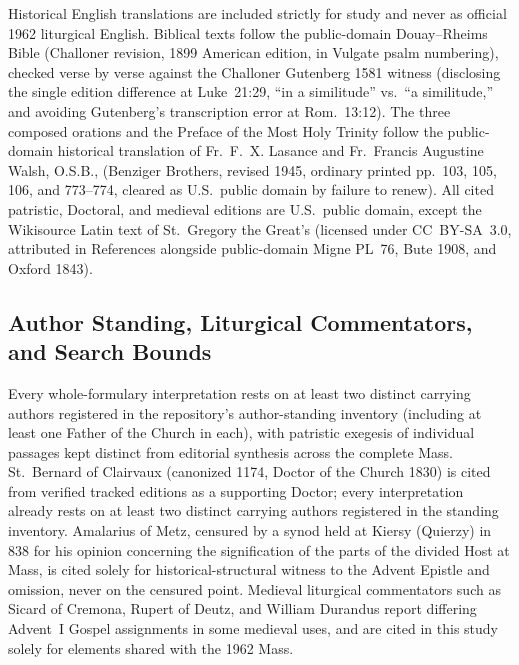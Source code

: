 Historical English translations are included strictly for study and never as official 1962 liturgical English. Biblical texts follow the public-domain Douay--Rheims Bible (Challoner revision, 1899 American edition, in Vulgate psalm numbering), checked verse by verse against the Challoner Gutenberg 1581 witness (disclosing the single edition difference at Luke~21:29, ``in a similitude'' vs.\ ``a similitude,'' and avoiding Gutenberg's transcription error at Rom.~13:12). The three composed orations and the Preface of the Most Holy Trinity follow the public-domain historical translation of Fr.~F.~X. Lasance and Fr.~Francis Augustine Walsh, O.S.B.,  (Benziger Brothers, revised 1945, ordinary printed pp.~103, 105, 106, and 773--774, cleared as U.S.~public domain by failure to renew). All cited patristic, Doctoral, and medieval editions are U.S.~public domain, except the Wikisource Latin text of St.~Gregory the Great's  (licensed under CC~BY-SA~3.0, attributed in References alongside public-domain Migne PL~76, Bute 1908, and Oxford 1843).

\subsection{Author Standing, Liturgical Commentators, and Search Bounds}
Every whole-formulary interpretation rests on at least two distinct carrying authors registered in the repository's author-standing inventory (including at least one Father of the Church in each), with patristic exegesis of individual passages kept distinct from editorial synthesis across the complete Mass. St.~Bernard of Clairvaux (canonized 1174, Doctor of the Church 1830) is cited from verified tracked editions as a supporting Doctor; every interpretation already rests on at least two distinct carrying authors registered in the standing inventory. Amalarius of Metz, censured by a synod held at Kiersy (Quierzy) in 838 for his opinion concerning the signification of the parts of the divided Host at Mass, is cited solely for historical-structural witness to the Advent Epistle and  omission, never on the censured point. Medieval liturgical commentators such as Sicard of Cremona, Rupert of Deutz, and William Durandus report differing Advent~I Gospel assignments in some medieval uses, and are cited in this study solely for elements shared with the 1962 Mass.

